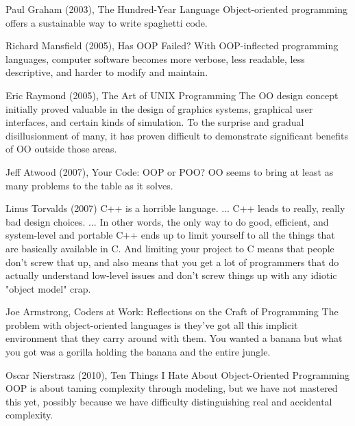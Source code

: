 \documentclass[12pt]{book}
\begin{document}
\begin{kodequote}{Paul Graham (2003), The Hundred-Year Language}
	Object-oriented programming offers a sustainable way to write spaghetti code.
\end{kodequote}

\begin{kodequote}{Richard Mansfield (2005), Has OOP Failed?}
	With OOP-inflected programming languages, computer software becomes more verbose, less readable, less descriptive, and harder to modify and maintain.
\end{kodequote}

\begin{kodequote}{Eric Raymond (2005), The Art of UNIX Programming}
	The OO design concept initially proved valuable in the design of graphics systems, graphical user interfaces, and certain kinds of simulation. To the surprise and gradual disillusionment of many, it has proven difficult to demonstrate significant benefits of OO outside those areas.
\end{kodequote}

\begin{kodequote}{Jeff Atwood (2007), Your Code: OOP or POO?}
	OO seems to bring at least as many problems to the table as it solves.
\end{kodequote}


\begin{kodequote}{Linus Torvalds (2007)}
	C++ is a horrible language. ... C++ leads to really, really bad design choices. ... In other words, the only way to do good, efficient, and system-level and portable C++ ends up to limit yourself to all the things that are basically available in C. And limiting your project to C means that people don't screw that up, and also means that you get a lot of programmers that do actually understand low-level issues and don't screw things up with any idiotic "object model" crap.
\end{kodequote}

\begin{kodequote}{Joe Armstrong, Coders at Work: Reflections on the Craft of Programming}
	The problem with object-oriented languages is they've got all this implicit environment that they carry around with them. 
	You wanted a banana but what you got was a gorilla holding the banana and the entire jungle.
\end{kodequote}

\begin{kodequote}{Oscar Nierstrasz (2010), Ten Things I Hate About Object-Oriented Programming}
	OOP is about taming complexity through modeling, but we have not mastered this yet, possibly because we have difficulty distinguishing real and accidental complexity.
\end{kodequote}
\end{document}
